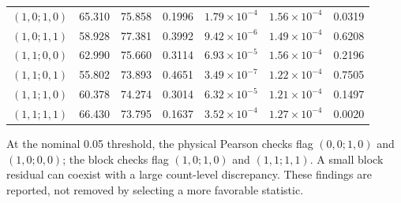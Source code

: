 \documentclass[10pt,a4paper]{article}
\begin{document}
\begin{table}[htbp]
\begin{tabular}{lrrrrrr}
$(1,0;1,0)$ & 65.310 & 75.858 & 0.1996 & $1.79\times10^{-4}$ & $1.56\times10^{-4}$ & 0.0319 \\
$(1,0;1,1)$ & 58.928 & 77.381 & 0.3992 & $9.42\times10^{-6}$ & $1.49\times10^{-4}$ & 0.6208 \\
$(1,1;0,0)$ & 62.990 & 75.660 & 0.3114 & $6.93\times10^{-5}$ & $1.56\times10^{-4}$ & 0.2196 \\
$(1,1;0,1)$ & 55.802 & 73.893 & 0.4651 & $3.49\times10^{-7}$ & $1.22\times10^{-4}$ & 0.7505 \\
$(1,1;1,0)$ & 60.378 & 74.274 & 0.3014 & $6.32\times10^{-5}$ & $1.21\times10^{-4}$ & 0.1497 \\
$(1,1;1,1)$ & 66.430 & 73.795 & 0.1637 & $3.52\times10^{-4}$ & $1.27\times10^{-4}$ & 0.0020 \\
\bottomrule\end{tabular}\end{table}\par
At the nominal 0.05 threshold, the physical Pearson checks flag $(0,0;1,0)$ and $(1,0;0,0)$; the block checks flag $(1,0;1,0)$ and $(1,1;1,1)$. A small block residual can coexist with a large count-level discrepancy. These findings are reported, not removed by selecting a more favorable statistic.\clearpage
\end{document}
